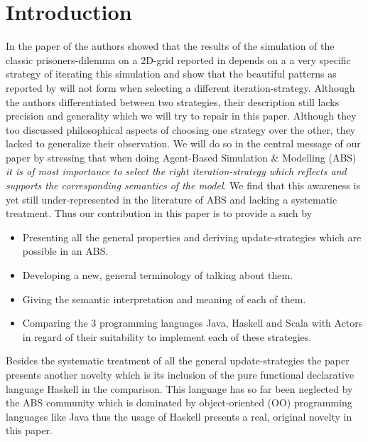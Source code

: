\section{Introduction}
In the paper of \cite{huberman_evolutionary_1993} the authors showed that the results of the simulation of the classic prisoners-dilemma on a 2D-grid reported in \cite{nowak_evolutionary_1992} depends on a a very specific strategy of iterating this simulation and show that the beautiful patterns as reported by \cite{nowak_evolutionary_1992} will not form when selecting a different iteration-strategy. Although the authors differentiated between two strategies, their description still lacks precision and generality which we will try to repair in this paper. Although they too discussed philosophical aspects of choosing one strategy over the other, they lacked to generalize their observation. We will do so in the central message of our paper by stressing that when doing Agent-Based Simulation \& Modelling (ABS) \textit{it is of most importance to select the right iteration-strategy which reflects and supports the corresponding semantics of the model}. We find that this awareness is yet still under-represented in the literature of ABS and lacking a systematic treatment. Thus our contribution in this paper is to provide a such by
\begin{itemize}
	\item Presenting all the general properties and deriving update-strategies which are possible in an ABS.
	\item Developing a new, general terminology of talking about them.
	\item Giving the semantic interpretation and meaning of each of them.
	\item Comparing the 3 programming languages Java, Haskell and Scala with Actors in regard of their suitability to implement each of these strategies.
\end{itemize}

Besides the systematic treatment of all the general update-strategies the paper presents another novelty which is its inclusion of the pure functional declarative language Haskell in the comparison. This language has so far been neglected by the ABS community which is dominated by object-oriented (OO) programming languages like Java thus the usage of Haskell presents a real, original novelty in this paper.